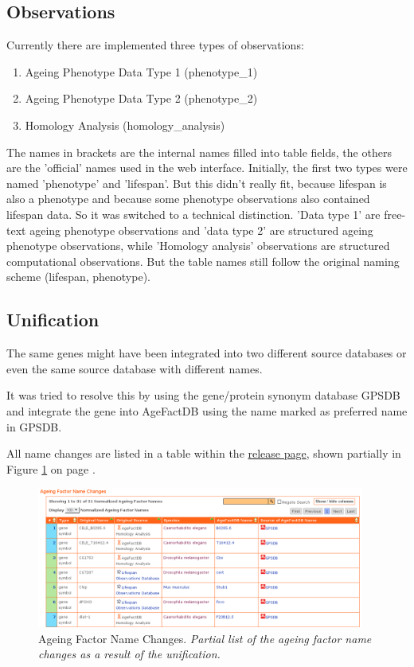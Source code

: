 \documentclass[12pt,a4paper,notitlepage,twoside]{report}
\begin{document}
\subsection{Observations}
Currently there are implemented three types of observations:
\begin{enumerate}[label=\textbf{\arabic*.}]
\item Ageing Phenotype Data Type 1 (phenotype\_1)
\item Ageing Phenotype Data Type 2 (phenotype\_2)
\item Homology Analysis (homology\_analysis)
\end{enumerate}

The names in brackets are the internal names filled into table fields, the others are the 'official' names used in the web interface. Initially, the first two types were named 'phenotype' and 'lifespan'. But this didn't really fit, because lifespan is also a phenotype and because some phenotype observations also contained lifespan data. So it was switched to a technical distinction. 'Data type 1' are free-text ageing phenotype observations and 'data type 2' are structured ageing phenotype observations, while 'Homology analysis' observations are structured computational observations. But the table names still follow the original naming scheme (lifespan, phenotype).

\subsection{Unification}
\label{sec:unification}
The same genes might have been integrated into two different source databases or even the same source database with different names.  

It was tried to resolve this by using the gene/protein synonym database GPSDB and integrate the gene into AgeFactDB using the name marked as preferred name in GPSDB.

All name changes are listed in a table within the \href{http://agefactdb.jenage.de/cgi-bin/jaDB.cgi?VIEW=release}{release page}, shown partially in Figure \ref{fig:name_changes} on page \pageref{fig:name_changes}.

 \begin{figure}[!ht]
      \includegraphics[width=0.96\textwidth]{data/name_changes.png}
  \caption[Ageing Factor Name Changes]{Ageing Factor Name Changes. 
  \newline \textit{Partial list of the ageing factor name changes as a result of the unification.}
      \label{fig:name_changes}
      }
\end{figure}





\end{document}
